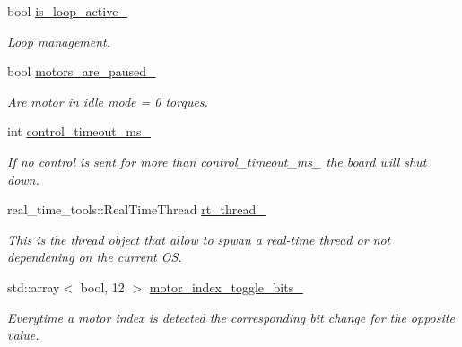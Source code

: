 \begin{DoxyCompactItemize}
bool \hyperlink{classblmc__drivers_1_1SpiBus_acf6f61ce04098f05fd04971b477da07c}{is\+\_\+loop\+\_\+active\+\_\+}
\begin{DoxyCompactList}\small\item\em Loop management. \end{DoxyCompactList}\item 
\mbox{\label{classblmc__drivers_1_1SpiBus_ab1ac8ef913898d20cc678f205e27662e}} 
bool \hyperlink{classblmc__drivers_1_1SpiBus_ab1ac8ef913898d20cc678f205e27662e}{motors\+\_\+are\+\_\+paused\+\_\+}
\begin{DoxyCompactList}\small\item\em Are motor in idle mode = 0 torques. \end{DoxyCompactList}\item 
\mbox{\label{classblmc__drivers_1_1SpiBus_ab861c026ce0d206b802ab521055885fd}} 
int \hyperlink{classblmc__drivers_1_1SpiBus_ab861c026ce0d206b802ab521055885fd}{control\+\_\+timeout\+\_\+ms\+\_\+}
\begin{DoxyCompactList}\small\item\em If no control is sent for more than control\+\_\+timeout\+\_\+ms\+\_\+ the board will shut down. \end{DoxyCompactList}\item 
\mbox{\label{classblmc__drivers_1_1SpiBus_aaae2fa36dfe60f6155cf8b010c16fc8f}} 
real\+\_\+time\+\_\+tools\+::\+Real\+Time\+Thread \hyperlink{classblmc__drivers_1_1SpiBus_aaae2fa36dfe60f6155cf8b010c16fc8f}{rt\+\_\+thread\+\_\+}
\begin{DoxyCompactList}\small\item\em This is the thread object that allow to spwan a real-\/time thread or not dependening on the current OS. \end{DoxyCompactList}\item 
std\+::array$<$ bool, 12 $>$ \hyperlink{classblmc__drivers_1_1SpiBus_a5805dd95171df8f26efdae85ea02662c}{motor\+\_\+index\+\_\+toggle\+\_\+bits\+\_\+}
\begin{DoxyCompactList}\small\item\em Everytime a motor index is detected the corresponding bit change for the opposite value. \end{DoxyCompactList}\end{DoxyCompactItemize}


